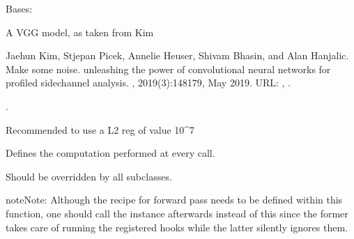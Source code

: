 \documentclass[letterpaper,10pt,english]{sphinxmanual}
\begin{document}
\begin{fulllineitems}
\label{\detokenize{MLSCAlib.Architectures:MLSCAlib.Architectures.torch_models.VGG16}}
\pysigstartsignatures
{}
\pysigstopsignatures
\sphinxAtStartPar
Bases: 

\sphinxAtStartPar
A VGG model, as taken from Kim %
\begin{footnote}[12]\sphinxAtStartFootnote
Jaehun Kim, Stjepan Picek, Annelie Heuser, Shivam Bhasin, and Alan Hanjalic. Make some noise. unleashing the power of convolutional neural networks for profiled side\sphinxhyphen{}channel analysis. , 2019(3):148\textendash{}179, May 2019. URL: , .
%
\end{footnote}.

\sphinxAtStartPar
Recommended to use a L2 reg of value 10\textasciicircum{}\sphinxhyphen{}7

\begin{fulllineitems}
\label{\detokenize{MLSCAlib.Architectures:MLSCAlib.Architectures.torch_models.VGG16.forward}}
\pysigstartsignatures
{}
\pysigstopsignatures
\sphinxAtStartPar
Defines the computation performed at every call.

\sphinxAtStartPar
Should be overridden by all subclasses.

\begin{sphinxadmonition}{note}{Note:}
\sphinxAtStartPar
Although the recipe for forward pass needs to be defined within
this function, one should call the  instance afterwards
instead of this since the former takes care of running the
registered hooks while the latter silently ignores them.
\end{sphinxadmonition}


\end{fulllineitems}
\end{fulllineitems}
\end{document}
